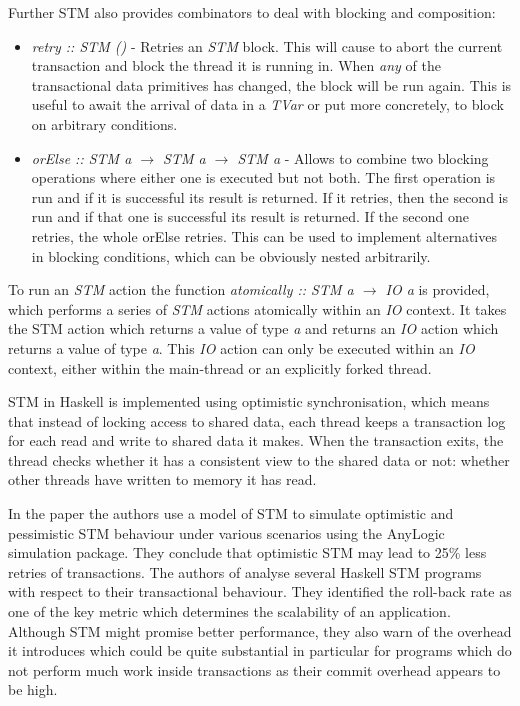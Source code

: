 Further STM also provides combinators to deal with blocking and composition:

\begin{itemize}
	\item \textit{retry :: STM ()} - Retries an \textit{STM} block. This will cause to abort the current transaction and block the thread it is running in. When \textit{any} of the transactional data primitives has changed, the block will be run again. This is useful to await the arrival of data in a \textit{TVar} or put more concretely, to block on arbitrary conditions. 
	
	\item \textit{orElse :: STM a $\rightarrow$ STM a $\rightarrow$ STM a} - Allows to combine two blocking operations where either one is executed but not both. The first operation is run and if it is successful its result is returned. If it retries, then the second is run and if that one is successful its result is returned. If the second one retries, the whole orElse retries. This can be used to implement alternatives in blocking conditions, which can be obviously nested arbitrarily.
\end{itemize}

To run an \textit{STM} action the function \textit{atomically :: STM a $\rightarrow$ IO a} is provided, which performs a series of \textit{STM} actions atomically within an \textit{IO} context. It takes the STM action which returns a value of type \textit{a} and returns an \textit{IO} action which returns a value of type \textit{a}. This \textit{IO} action can only be executed within an \textit{IO} context, either within the main-thread or an explicitly forked thread.

STM in Haskell is implemented using optimistic synchronisation, which means that instead of locking access to shared data, each thread keeps a transaction log for each read and write to shared data it makes. When the transaction exits, the thread checks whether it has a consistent view to the shared data or not: whether other threads have written to memory it has read. %

In the paper \cite{heindl_modeling_2009} the authors use a model of STM to simulate optimistic and pessimistic STM behaviour under various scenarios using the AnyLogic simulation package. They conclude that optimistic STM may lead to 25\% less retries of transactions. The authors of \cite{perfumo_limits_2008} analyse several Haskell STM programs with respect to their transactional behaviour. They identified the roll-back rate as one of the key metric which determines the scalability of an application. Although STM might promise better performance, they also warn of the overhead it introduces which could be quite substantial in particular for programs which do not perform much work inside transactions as their commit overhead appears to be high.


